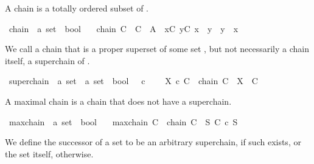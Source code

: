 \begin{isabellebody}
\begin{isamarkuptext}
A chain is a totally ordered subset of .%
\end{isamarkuptext}\isamarkuptrue%
\isamarkupfalse%
\ chain\ {\isacharcolon}{\kern0pt}{\isacharcolon}{\kern0pt}\ {\isachardoublequoteopen}{\isacharprime}{\kern0pt}a\ set\ {\isasymRightarrow}\ bool{\isachardoublequoteclose}\isanewline
\ \ \ {\isachardoublequoteopen}chain\ C\ {\isasymlongleftrightarrow}\ C\ {\isasymsubseteq}\ A\ {\isasymand}\ {\isacharparenleft}{\kern0pt}{\isasymforall}x{\isasymin}C{\isachardot}{\kern0pt}\ {\isasymforall}y{\isasymin}C{\isachardot}{\kern0pt}\ x\ {\isasymsqsubseteq}\ y\ {\isasymor}\ y\ {\isasymsqsubseteq}\ x{\isacharparenright}{\kern0pt}{\isachardoublequoteclose}%
\begin{isamarkuptext}%
We call a chain that is a proper superset of some set ,
  but not necessarily a chain itself, a superchain of .%
\end{isamarkuptext}\isamarkuptrue%
\isamarkupfalse%
\ superchain\ {\isacharcolon}{\kern0pt}{\isacharcolon}{\kern0pt}\ {\isachardoublequoteopen}{\isacharprime}{\kern0pt}a\ set\ {\isasymRightarrow}\ {\isacharprime}{\kern0pt}a\ set\ {\isasymRightarrow}\ bool{\isachardoublequoteclose}\ \ {\isacharparenleft}{\kern0pt}\ {\isachardoublequoteopen}{\isacharless}{\kern0pt}c{\isachardoublequoteclose}\ {}{}{\isacharparenright}{\kern0pt}\isanewline
\ \ \ {\isachardoublequoteopen}X\ {\isacharless}{\kern0pt}c\ C\ {\isasymequiv}\ chain\ C\ {\isasymand}\ X\ {\isasymsubset}\ C{\isachardoublequoteclose}%
\begin{isamarkuptext}%
A maximal chain is a chain that does not have a superchain.%
\end{isamarkuptext}\isamarkuptrue%
\isamarkupfalse%
\ maxchain\ {\isacharcolon}{\kern0pt}{\isacharcolon}{\kern0pt}\ {\isachardoublequoteopen}{\isacharprime}{\kern0pt}a\ set\ {\isasymRightarrow}\ bool{\isachardoublequoteclose}\isanewline
\ \ \ {\isachardoublequoteopen}maxchain\ C\ {\isasymlongleftrightarrow}\ chain\ C\ {\isasymand}\ {\isacharparenleft}{\kern0pt}{\isasymnexists}S{\isachardot}{\kern0pt}\ C\ {\isacharless}{\kern0pt}c\ S{\isacharparenright}{\kern0pt}{\isachardoublequoteclose}%
\begin{isamarkuptext}%
We define the successor of a set to be an arbitrary
  superchain, if such exists, or the set itself, otherwise.%
\end{isamarkuptext}\isamarkuptrue%
\isamarkupfalse%

\end{isabellebody}

